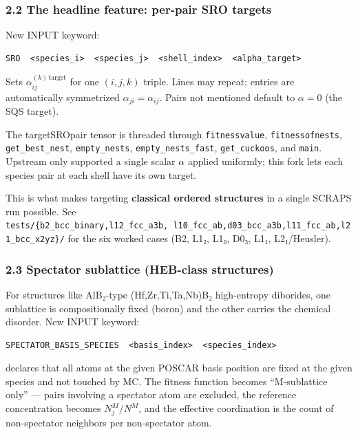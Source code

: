 \documentclass[
  11pt,
]{article}
\begin{document}
\subsubsection{2.2 The headline feature: per-pair SRO
targets}\label{the-headline-feature-per-pair-sro-targets}

New INPUT keyword:

\begin{verbatim}
SRO  <species_i>  <species_j>  <shell_index>  <alpha_target>
\end{verbatim}

Sets \(\alpha_{ij}^{(k)\,\mathrm{target}}\) for one \((i, j, k)\)
triple. Lines may repeat; entries are automatically symmetrized
\(\alpha_{ji} = \alpha_{ij}\). Pairs not mentioned default to
\(\alpha = 0\) (the SQS target).

The targetSROpair tensor is threaded through \texttt{fitnessvalue},
\texttt{fitnessofnests}, \texttt{get\_best\_nest},
\texttt{empty\_nests}, \texttt{empty\_nests\_fast},
\texttt{get\_cuckoos}, and \texttt{main}. Upstream only supported a
single scalar \(\alpha\) applied uniformly; this fork lets each species
pair at each shell have its own target.

This is what makes targeting \textbf{classical ordered structures} in a
single SCRAPS run possible. See
\texttt{tests/\{b2\_bcc\_binary,l12\_fcc\_a3b,\ l10\_fcc\_ab,d03\_bcc\_a3b,l11\_fcc\_ab,l21\_bcc\_x2yz\}/}
for the six worked cases (B2, L1₂, L1₀, D0₃, L1₁, L2₁/Heusler).

\subsubsection{2.3 Spectator sublattice (HEB-class
structures)}\label{spectator-sublattice-heb-class-structures}

For structures like AlB₂-type (Hf,Zr,Ti,Ta,Nb)B₂ high-entropy diborides,
one sublattice is compositionally fixed (boron) and the other carries
the chemical disorder. New INPUT keyword:

\begin{verbatim}
SPECTATOR_BASIS_SPECIES  <basis_index>  <species_index>
\end{verbatim}

declares that all atoms at the given POSCAR basis position are fixed at
the given species and not touched by MC. The fitness function becomes
``M-sublattice only'' --- pairs involving a spectator atom are excluded,
the reference concentration becomes \(N_j^M / N^M\), and the effective
coordination is the count of non-spectator neighbors per non-spectator
atom.
\end{document}

